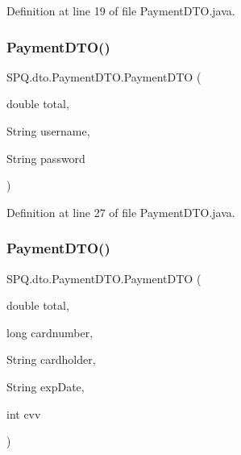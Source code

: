 Definition at line 19 of file Payment\+D\+T\+O.\+java.

\mbox{\label{class_s_p_q_1_1dto_1_1_payment_d_t_o_ab51beb9eef60e0b57b11bab85ce42454}} 
\subsubsection{\texorpdfstring{Payment\+D\+T\+O()}{PaymentDTO()}\hspace{0.1cm}{\footnotesize\ttfamily [4/6]}}
{\footnotesize\ttfamily S\+P\+Q.\+dto.\+Payment\+D\+T\+O.\+Payment\+D\+TO (\begin{DoxyParamCaption}\item[{double}]{total,  }\item[{String}]{username,  }\item[{String}]{password }\end{DoxyParamCaption})}



Definition at line 27 of file Payment\+D\+T\+O.\+java.

\mbox{\label{class_s_p_q_1_1dto_1_1_payment_d_t_o_a4a6f91d0976ce0af97a8f7f15658294c}} 
\subsubsection{\texorpdfstring{Payment\+D\+T\+O()}{PaymentDTO()}\hspace{0.1cm}{\footnotesize\ttfamily [5/6]}}
{\footnotesize\ttfamily S\+P\+Q.\+dto.\+Payment\+D\+T\+O.\+Payment\+D\+TO (\begin{DoxyParamCaption}\item[{double}]{total,  }\item[{long}]{cardnumber,  }\item[{String}]{cardholder,  }\item[{String}]{exp\+Date,  }\item[{int}]{cvv }\end{DoxyParamCaption})}




